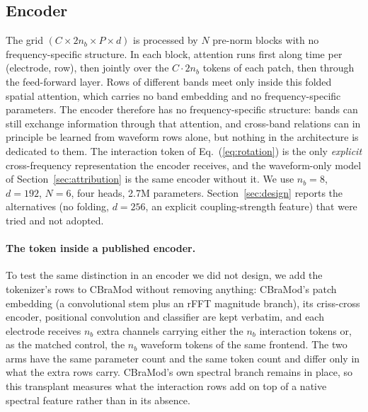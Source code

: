 \subsection{Encoder}
\label{sec:encoder}

The grid $(C \times 2n_b \times P \times d)$ is processed by $N$ pre-norm
blocks with no frequency-specific structure. In each block, attention runs first along time
per (electrode, row), then jointly over the $C \cdot 2n_b$ tokens of each
patch, then through the feed-forward layer. Rows of different bands meet
only inside this folded spatial attention, which carries no band
embedding and no frequency-specific parameters. The encoder therefore has
no frequency-specific structure: bands can still exchange information
through that attention, and cross-band relations can in principle be
learned from waveform rows alone, but nothing in the architecture is
dedicated to them. The interaction token of Eq.~(\ref{eq:rotation}) is
the only \emph{explicit} cross-frequency representation the encoder
receives, and the waveform-only model of Section~\ref{sec:attribution}
is the same encoder without it. We use $n_b{=}8$, $d{=}192$, $N{=}6$, four heads, 2.7M parameters. Section~\ref{sec:design}
reports the alternatives (no folding, $d{=}256$, an explicit
coupling-strength feature) that were tried and not adopted.

\paragraph{The token inside a published encoder.}
To test the same distinction in an encoder we did not design, we add the
tokenizer's rows to CBraMod \citep{wang2025cbramod} without removing
anything: CBraMod's patch embedding (a convolutional stem plus an rFFT
magnitude branch), its criss-cross encoder, positional convolution and
classifier are kept verbatim, and each electrode receives $n_b$ extra
channels carrying either the $n_b$ interaction tokens or, as the matched
control, the $n_b$ waveform tokens of the same frontend. The two arms have
the same parameter count and the same token count and differ only in what
the extra rows carry. CBraMod's own spectral branch remains in place, so this transplant
measures what the interaction rows add on top of a native spectral
feature rather than in its absence.
